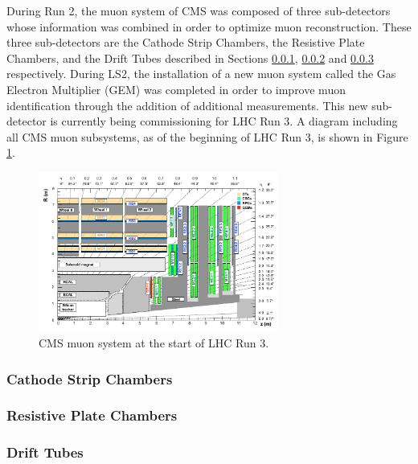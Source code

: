 During Run 2, the muon system of CMS was composed of three sub-detectors whose information was combined in order to optimize muon reconstruction. These three sub-detectors are the Cathode Strip Chambers, the Resistive Plate Chambers, and the Drift Tubes described in Sections \ref{sec:CSC}, \ref{sec:RPC} and \ref{sec:DT} respectively. During LS2, the installation of a new muon system called the Gas Electron Multiplier (GEM) was completed in order to improve muon identification through the addition of additional measurements. This new sub-detector is currently being commissioning for LHC Run 3. A diagram including all CMS muon subsystems, as of the beginning of LHC Run 3, is shown in Figure \ref{fig:MuonSystem}.

\begin{figure}[H]
    \centering
    \includegraphics[width=0.7\textwidth]{Images/CMS/Muons/MuonSystem.png}
    \caption{CMS muon system at the start of LHC Run 3.}
    \label{fig:MuonSystem}
\end{figure}


\subsubsection{Cathode Strip Chambers}
 \label{sec:CSC}

\subsubsection{Resistive Plate Chambers}
 \label{sec:RPC}

\subsubsection{Drift Tubes}
 \label{sec:DT}

